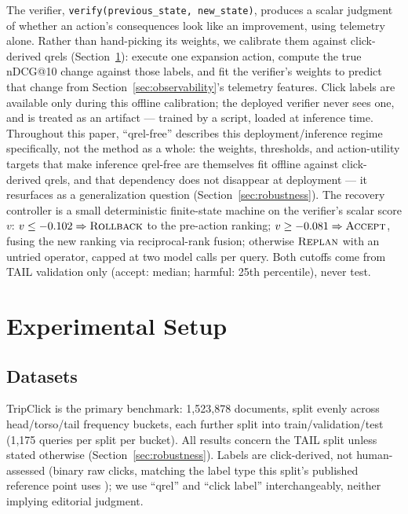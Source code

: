 \documentclass[conference]{IEEEtran}
\begin{document}
The verifier, \texttt{verify(previous\_state, new\_state)}, produces a
scalar judgment of whether an action's consequences look like an
improvement, using telemetry alone. Rather than hand-picking its
weights, we calibrate them against click-derived qrels
(Section~\ref{sec:setup}): execute one expansion action, compute the
true nDCG@10 change against those labels, and fit the verifier's
weights to predict that change from Section~\ref{sec:observability}'s
telemetry features. Click labels are available only during this
offline calibration; the deployed verifier never sees one, and is
treated as an artifact --- trained by a script, loaded at inference
time. Throughout this paper, ``qrel-free'' describes this
deployment/inference regime specifically, not the method as a whole:
the weights, thresholds, and action-utility targets that make
inference qrel-free are themselves fit offline against click-derived
qrels, and that dependency does not disappear at deployment --- it
resurfaces as a generalization question (Section~\ref{sec:robustness}).
The recovery controller is a small deterministic finite-state
machine on the verifier's scalar score $v$: $v \le -0.102 \Rightarrow
\textsc{Rollback}$ to the pre-action ranking; $v \ge -0.081 \Rightarrow
\textsc{Accept}$, fusing the new ranking via reciprocal-rank fusion;
otherwise $\textsc{Replan}$ with an untried operator, capped at two
model calls per query. Both cutoffs come from TAIL validation only
(accept: median; harmful: 25th percentile), never test.

\section{Experimental Setup}
\label{sec:setup}

\subsection{Datasets}

TripClick \cite{tripclick} is the primary benchmark: 1{,}523{,}878
documents, split evenly across head/torso/tail frequency buckets, each
further split into train/validation/test (1{,}175 queries per split
per bucket). All results concern the TAIL split unless stated
otherwise (Section~\ref{sec:robustness}). Labels are click-derived,
not human-assessed (binary raw clicks, matching the label type this
split's published reference point uses \cite{tripclick}); we use
``qrel'' and ``click label'' interchangeably, neither implying
editorial judgment.
\end{document}
